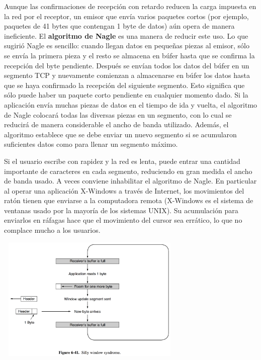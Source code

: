 \documentclass[10pt,a4paper]{report}
\begin{document}
	\par Aunque las confirmaciones de recepción con retardo reducen la carga impuesta en la red por el receptor, un emisor que envía varios paquetes cortos (por ejemplo, paquetes de 41 bytes que contengan 1 byte de datos) aún opera de manera ineficiente. El \textbf{algoritmo de Nagle} es una manera de reducir este uso. Lo que sugirió Nagle es sencillo: cuando llegan datos en pequeñas piezas al emisor, sólo se envía la primera pieza y el resto se almacena en búfer hasta que se confirma la recepción del byte pendiente. Después se envían todos los datos del búfer en un segmento TCP y nuevamente comienzan a almacenarse en búfer los datos hasta que se haya confirmado la recepción del siguiente segmento. Esto significa que sólo puede haber un paquete corto pendiente en cualquier momento dado. Si la aplicación envía muchas piezas de datos en el tiempo de ida y vuelta, el algoritmo de Nagle colocará todas las diversas piezas en un segmento, con lo cual se reducirá de manera considerable el ancho de banda utilizado. Además, el algoritmo establece que se debe enviar un nuevo segmento si se acumularon suficientes datos como para llenar un segmento máximo.
	
	\par Si el usuario escribe con rapidez y la red es lenta, puede entrar una cantidad importante de caracteres en cada segmento, reduciendo en gran medida el ancho de banda usado. A veces conviene inhabilitar el algoritmo de Nagle. En particular al operar una aplicación X-Windows a través de Internet, los movimientos del ratón tienen que enviarse a la computadora remota (X-Windows es el sistema de ventanas usado por la mayoría de los sistemas UNIX). Su acumulación para enviarlos en ráfagas hace que el movimiento del cursor sea errático, lo que no complace mucho a los usuarios.
	
	\begin{center}
		\includegraphics[width=9cm, height=6cm]{./imagenes/ventana.png}
	\end{center}
\end{document}
